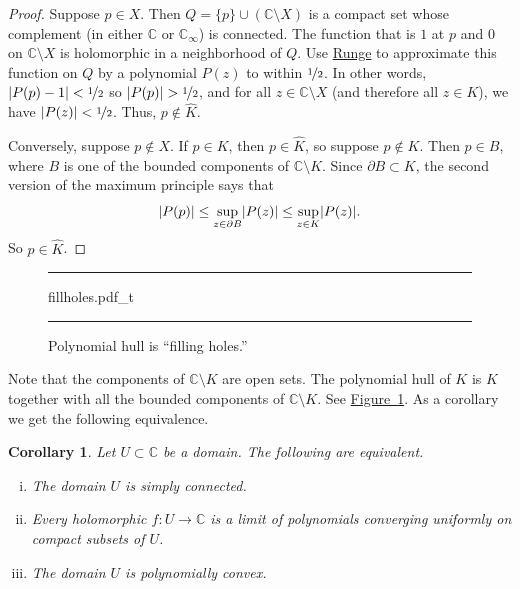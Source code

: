 \documentclass[12pt,openany]{book}
\newcommand{\avoidbreak}{\postdisplaypenalty=100}
\newcommand{\sabs}[1]{\lvert {#1} \rvert}
\newcommand{\abs}[1]{\left\lvert {#1} \right\rvert}
\newcommand{\C}{{\mathbb{C}}}
\newcommand{\myquote}[1]{``#1''}
\theoremstyle{plain}
\newtheorem{cor}[thm]{Corollary}
\theoremstyle{remark}
\theoremstyle{definition}
\newenvironment{myfig}{%
\begin{figure}[h!t]
\noindent\rule{\textwidth}{0.5pt}\vspace{12pt}\par\centering}%
{\par\noindent\rule{\textwidth}{0.5pt}
\end{figure}}
\theoremstyle{exercise}
\theoremstyle{example}
\newcommand{\figureref}[1]{\hyperref[#1]{Figure~\ref*{#1}}}
\begin{document}
\begin{proof}
Suppose $p \in X$.  Then $Q=\{ p \} \cup ( \C \setminus X )$ is a compact set
whose
complement (in either $\C$ or $\C_\infty$) is connected.
The function that is $1$ at $p$ and $0$ on $\C \setminus X$ is
holomorphic in a neighborhood of $Q$.
Use \hyperref[thm:rungecpt]{Runge} to approximate this function on $Q$
by a polynomial $P(z)$ to within $\nicefrac{1}{2}$.  In other words,
$\abs{P(p)-1} < \nicefrac{1}{2}$ so 
$\abs{P(p)} > \nicefrac{1}{2}$, and for all $z \in \C \setminus X$ (and
therefore all $z \in K$),
we have 
$\abs{P(z)} < \nicefrac{1}{2}$.  Thus, $p \notin \widehat{K}$.

Conversely, suppose $p \notin X$.
If $p \in K$, then $p \in \widehat{K}$, so suppose $p \notin K$.
Then $p \in B$, where $B$
is one of the bounded components of $\C \setminus K$.  Since
$\partial B \subset K$, the second version of the maximum
principle says that 
\begin{equation*}
\sabs{P(p)} \leq
\sup_{z \in \partial B} \sabs{P(z)}
\leq
\sup_{z \in K} \sabs{P(z)}.
\avoidbreak
\end{equation*}
So $p \in \widehat{K}$.
\end{proof}

\begin{myfig}
{fillholes.pdf_t}
\caption{Polynomial hull is \myquote{filling holes.}\label{fig:fillholes}}
\end{myfig}

Note that the components of $\C \setminus K$ are open sets.
The polynomial hull of $K$ is $K$ together with all the bounded components
of $\C \setminus K$.  See \figureref{fig:fillholes}.
As a corollary we get the following equivalence.

\begin{cor}
Let $U \subset \C$ be a domain.  The following are equivalent.
\begin{enumerate}[(i)]
\item\label{cor:polyhull:i}
The domain $U$ is simply connected.
\item\label{cor:polyhull:ii}
Every holomorphic $f \colon U \to \C$ is a limit of polynomials
converging uniformly on compact subsets of $U$.
\item\label{cor:polyhull:iii}
The domain $U$ is polynomially convex.
\end{enumerate}
\end{cor}
\end{document}
